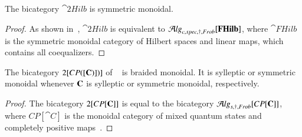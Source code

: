 \begin{cor}
The bicategory $\cat{2Hilb}$ is symmetric monoidal.
\end{cor}

\begin{proof}
As shown in~\cite[Section 3.6.3]{westerthesis}, $\cat{2Hilb}$ is equivalent to $\mathcal{A}\mathit{lg}_{c,spec,\dagger, Frob}[\mathbf{FHilb}]$, where $\cat{FHilb}$ is the symmetric monoidal category of Hilbert spaces and linear maps, which contains all coequalizers.
\end{proof}


\begin{cor}
 The bicategory $2[CP([{\bf C})])]$ of ~\cite{heunenvicarywester} is braided monoidal. It is sylleptic or symmetric monoidal whenever ${\bf C}$ is sylleptic or symmetric monoidal, respectively.
\end{cor}

\begin{proof}
The bicategory $2[CP[{\bf C}]]$ is equal to the bicategory $\mathcal{A}\mathit{lg}_{s,\dagger, Frob}[CP[{\bf C}]]$, where $CP[\cat{C}]$ is the monoidal category of mixed quantum states and completely positive maps~\cite{chk:cqchannel}.
\end{proof}



